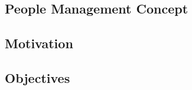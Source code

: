 \newline

\subsection{People Management Concept}
\label{sub-sec:pmconcept}

 \newline

\subsection{Motivation}
\label{sub-sec:Motivation}

 \newline

\subsection{Objectives}
\label{sub-sec:objectives}


